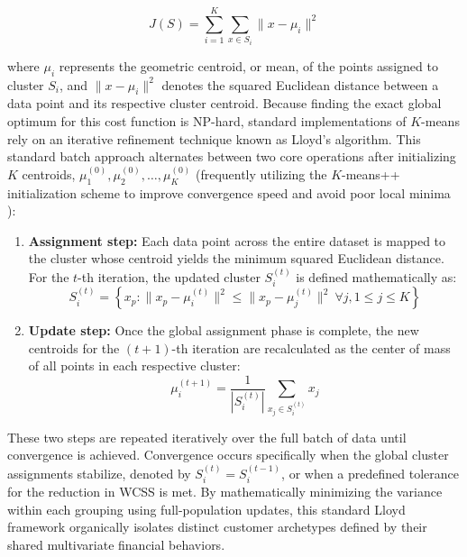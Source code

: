         \begin{equation}
        \label{eq:kmeanscost}
            J(S) = \sum_{i=1}^{K} \sum_{x \in S_i} \|x - \mu_i\|^2
        \end{equation}
        
        where $\mu_i$ represents the geometric centroid, or mean, of the points assigned to cluster $S_i$, and $\|x - \mu_i\|^2$ denotes the squared Euclidean distance between a data point and its respective cluster centroid.
        Because finding the exact global optimum for this cost function is NP-hard, standard implementations of $K$-means rely on an iterative refinement technique known as Lloyd's algorithm.
        This standard batch approach alternates between two core operations after initializing $K$ centroids, $\mu_1^{(0)}, \mu_2^{(0)}, \dots, \mu_K^{(0)}$ (frequently utilizing the $K$-means++ initialization scheme to improve convergence speed and avoid poor local minima \cite{arthur_K-means_2007}):
        
        \begin{enumerate}
            \item \textbf{Assignment step:} Each data point across the entire dataset is mapped to the cluster whose centroid yields the minimum squared Euclidean distance.
            For the $t$-th iteration, the updated cluster $S_i^{(t)}$ is defined mathematically as:
            \begin{equation}
                S_i^{(t)} = \left\{ x_p : \|x_p - \mu_i^{(t)}\|^2 \le \|x_p - \mu_j^{(t)}\|^2 \ \forall j, 1 \le j \le K \right\}
            \end{equation}
        
            \item \textbf{Update step:} Once the global assignment phase is complete, the new centroids for the $(t+1)$-th iteration are recalculated as the center of mass of all points in each respective cluster:
            \begin{equation}
                \mu_i^{(t+1)} = \frac{1}{|S_i^{(t)}|} \sum_{x_j \in S_i^{(t)}} x_j
            \end{equation}
        \end{enumerate}
        
        These two steps are repeated iteratively over the full batch of data until convergence is achieved. Convergence occurs specifically when the global cluster assignments stabilize, denoted by $S_i^{(t)} = S_i^{(t-1)}$, or when a predefined tolerance for the reduction in WCSS is met.
        By mathematically minimizing the variance within each grouping using full-population updates, this standard Lloyd framework organically isolates distinct customer archetypes defined by their shared multivariate financial behaviors.
        
